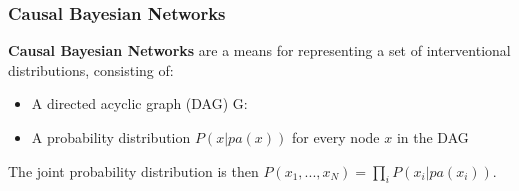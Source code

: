\documentclass{beamer}
\begin{document}
\begin{frame}
\frametitle{Causal Bayesian Networks}
\textbf{Causal Bayesian Networks} are a means for representing a set of interventional distributions, consisting of:
\pause
\begin{itemize}
	\item A directed acyclic graph (DAG) G:
\end{itemize}
	\begin{center}
     \end{center}
     \pause
\begin{itemize}
	\item A probability distribution $P(x| pa(x))$ for every node $x$ in the DAG
\end{itemize}
\pause

\bigskip
The joint probability distribution is then $P(x_1, ..., x_N) = \prod_{i} P(x_i | pa(x_i))$.

\end{frame}
\end{document}

